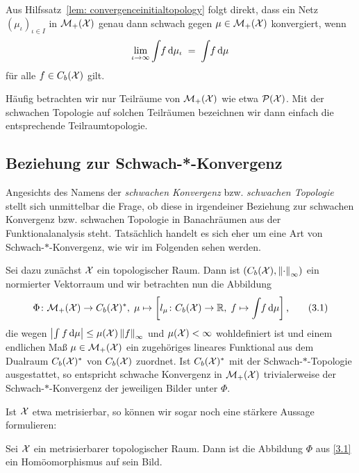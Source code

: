 \documentclass[../main/main.tex]{subfiles}
\begin{document}
	\begin{Bemerkung}
		Aus Hilfssatz~\ref{lem: convergenceinitialtopology} folgt direkt, dass ein Netz $(\mu_\iota)_{\iota \in I}$ in $\mathcal{M}_{+}(\mathcal{X})$ genau dann schwach gegen $\mu \in \mathcal{M}_{+}(\mathcal{X})$
		konvergiert, wenn
		\[ \lim_{\iota \to \infty} \int_{} \, f \, \mathrm{d}\mu_\iota \; = \; \int_{} \, f \, \mathrm{d}\mu \]
		für alle $f \in C_b(\mathcal{X})$ gilt.
	\end{Bemerkung}

	Häufig betrachten wir nur Teilräume von $\mathcal{M}_{+}(\mathcal{X})$ wie etwa $\mathcal{P}(\mathcal{X})$. Mit der schwachen Topologie auf solchen Teilräumen bezeichnen wir 
	dann einfach die entsprechende Teilraumtopologie.

	\subsection{Beziehung zur Schwach-*-Konvergenz}
	\label{subsec:BeziehungSchwachStern}
	
	Angesichts des Namens der \emph{schwachen Konvergenz} bzw. \emph{schwachen Topologie} stellt sich unmittelbar die Frage, ob diese in irgendeiner Beziehung zur schwachen Konvergenz bzw. schwachen Topologie in Banachräumen aus der 
	Funktionalanalysis steht. Tatsächlich handelt es sich eher um eine Art von Schwach-$\ast$-Konvergenz, wie wir im Folgenden sehen werden. 
	
	Sei dazu zunächst $\mathcal{X}$ ein topologischer Raum. Dann ist $(C_b(\mathcal{X}), \left\lVert\cdot\right\rVert_\infty)$ ein normierter Vektorraum und wir betrachten nun die Abbildung
	\[\Phi \colon \mathcal{M}_{+}(\mathcal{X}) \to C_b(\mathcal{X})^\ast, \; \mu \mapsto \left[l_\mu \colon C_b(\mathcal{X}) \to \mathbb{R}, \; f \mapsto \int_{} \, f \, \mathrm{d}\mu \right]  \text{,} \label{3.1} \tag{3.1}\]
	die wegen $\left| \int_{} \, f \, \mathrm{d}\mu \right| \leq \mu(\mathcal{X}) \left\lVert f\right\rVert_\infty$ und $\mu(\mathcal{X}) < \infty$ wohldefiniert ist 
	und einem endlichen Maß $\mu \in \mathcal{M}_{+}(\mathcal{X})$ ein zugehöriges lineares Funktional aus dem Dualraum $C_b(\mathcal{X})^\ast$ von $C_b(\mathcal{X})$ zuordnet. 
	Ist $C_b(\mathcal{X})^\ast$ mit der 
	Schwach-$\ast$-Topologie ausgestattet, so entspricht schwache Konvergenz in $\mathcal{M}_{+}(\mathcal{X})$ trivialerweise der 
	Schwach-$\ast$-Konvergenz der jeweiligen Bilder unter $\Phi$.
	
	Ist $\mathcal{X}$ etwa metrisierbar, so können wir sogar noch eine stärkere Aussage formulieren:
	
	\begin{Hilfssatz}
		Sei $\mathcal{X}$ ein metrisierbarer topologischer Raum. Dann ist die Abbildung $\Phi$ aus \eqref{3.1} ein Homöomorphismus auf sein Bild.
	\end{Hilfssatz}
\end{document}
